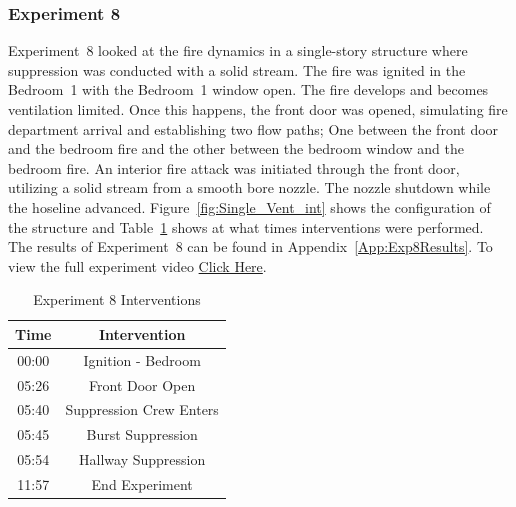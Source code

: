 \documentclass[12pt,oneside]{book}
\begin{document}
\subsubsection{Experiment 8}
Experiment~8 looked at the fire dynamics in a single-story structure where suppression was conducted with a solid stream. The fire was ignited in the Bedroom~1 with the Bedroom~1 window open. The fire develops and becomes ventilation limited. Once this happens, the front door was opened, simulating fire department arrival and establishing two flow paths; One between the front door and the bedroom fire and the other between the bedroom window and the bedroom fire. An interior fire attack was initiated through the front door, utilizing a solid stream from a smooth bore nozzle. The nozzle shutdown while the hoseline advanced. Figure~\ref{fig:Single_Vent_int} shows the configuration of the structure and Table~\ref{Table:Exp8Interventions} shows at what times interventions were performed. The results of Experiment~8 can be found in Appendix~\ref{App:Exp8Results}. To view the full experiment video \href{https://player.vimeo.com/video/170499608?autoplay=1}{Click Here}.

\begin{table}[H]
	\centering
	\caption{Experiment 8 Interventions}
	\begin{tabular}{|c|c|} 
		\hline
		Time & Intervention \\ \hline \hline
		00:00 & Ignition - Bedroom \\ \hline
		05:26 & Front Door Open \\ \hline
		05:40 & Suppression Crew Enters\\ \hline
		05:45 & Burst Suppression \\ \hline 
		05:54 & Hallway Suppression \\ \hline
		11:57 & End Experiment\\ \hline
	\end{tabular}
	\label{Table:Exp8Interventions}
\end{table}

\FloatBarrier
\end{document}
